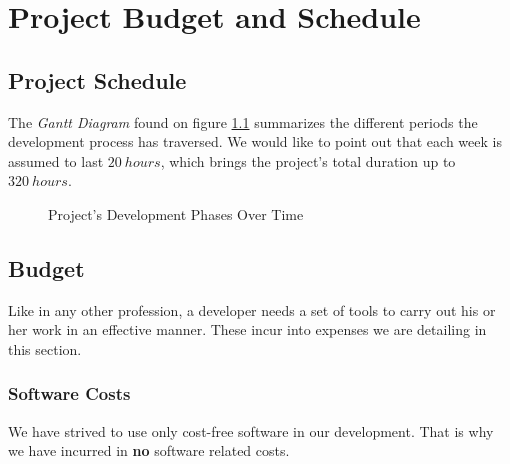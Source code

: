 \chapter{Project Budget and Schedule}
    \section{Project Schedule}
        The \textit{Gantt Diagram} found on figure \ref{fig:gantt} summarizes the different periods the development process has traversed. We would like to point out that each week is assumed to last $20\ hours$, which brings the project's total duration up to $320\ hours$.
        \begin{figure}
            \centering
            \caption{Project's Development Phases Over Time}
            \label{fig:gantt}
        \end{figure}

    \section{Budget}
        Like in any other profession, a developer needs a set of tools to carry out his or her work in an effective manner. These incur into expenses we are detailing in this section.

        \subsection{Software Costs}
            We have strived to use only cost-free software in our development. That is why we have incurred in \textbf{no} software related costs.


